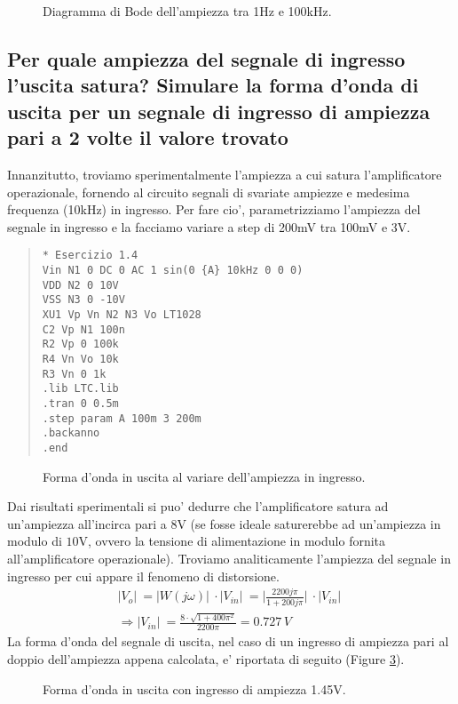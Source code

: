 \documentclass[a4paper,10pt]{article}
\begin{document}
\begin{figure}[h!]
	\centering
  	\caption{Diagramma di Bode dell'ampiezza tra 1Hz e 100kHz.}
  	\label{fig:bode1}
\end{figure}

\subsection{Per quale ampiezza del segnale di ingresso l'uscita satura? Simulare la forma  d'onda di uscita per un segnale di ingresso di ampiezza pari a 2 volte il valore trovato}
Innanzitutto, troviamo sperimentalmente l'ampiezza a cui satura l'amplificatore operazionale, fornendo al circuito segnali di svariate ampiezze e medesima frequenza (10kHz) in ingresso. Per fare cio', parametrizziamo l'ampiezza del segnale in ingresso e la facciamo variare a step di 200mV tra 100mV e 3V.
\small
\begin{quote}
\begin{verbatim}
* Esercizio 1.4
Vin N1 0 DC 0 AC 1 sin(0 {A} 10kHz 0 0 0)
VDD N2 0 10V
VSS N3 0 -10V
XU1 Vp Vn N2 N3 Vo LT1028
C2 Vp N1 100n
R2 Vp 0 100k
R4 Vn Vo 10k
R3 Vn 0 1k
.lib LTC.lib
.tran 0 0.5m
.step param A 100m 3 200m
.backanno
.end
\end{verbatim}
\end{quote}
\normalsize
\begin{figure}[h!]
	\centering
  	\caption{Forma d'onda in uscita al variare dell'ampiezza in ingresso.}
  	\label{fig:sat1}
\end{figure}
Dai risultati sperimentali si puo' dedurre che l'amplificatore satura ad un'ampiezza all'incirca pari a $8$V (se fosse ideale saturerebbe ad un'ampiezza in modulo di $10$V, ovvero la tensione di alimentazione in modulo fornita all'amplificatore operazionale). Troviamo analiticamente l'ampiezza del segnale in ingresso per cui appare il fenomeno di distorsione.
\begin{gather*}
	\lvert V_o \rvert\ = \lvert W(j\omega) \rvert\ \cdot \lvert V_{in} \rvert\ = \lvert \frac{2200j\pi}{1+200j\pi} \rvert\ \cdot \lvert V_{in} \rvert\ \\
	\Rightarrow \lvert V_{in} \rvert\ = \frac{8\cdot \sqrt{1+400\pi^2}}{2200\pi} = 0.727\,V
\end{gather*}
La forma d'onda del segnale di uscita, nel caso di un ingresso di ampiezza pari al doppio dell'ampiezza appena calcolata, e' riportata di seguito (Figure \ref{fig:sat2}).
    
\begin{figure}[h!]
	\centering
  	\caption{Forma d'onda in uscita con ingresso di ampiezza 1.45V.}
  	\label{fig:sat2}
\end{figure}
\end{document}

